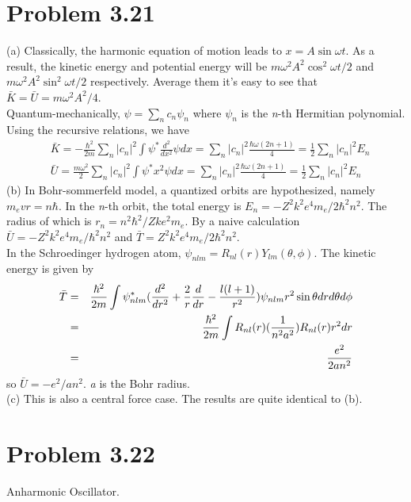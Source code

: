 \documentclass{article}
\begin{document}
\section*{Problem 3.21}
\noindent (a) Classically, the harmonic equation of motion leads to $x = A \sin \omega t$. As a result, the kinetic energy and potential energy will be $m \omega^{2} A^{2} \cos^{2} \omega t /2$ and $m \omega^{2} A^{2} \sin^{2} \omega t /2$ respectively. Average them it's easy to see that $\bar{K} = \bar{U} =m \omega^{2} A^{2}/4$.\\
Quantum-mechanically, $\psi = \sum_{n} c_{n} \psi_{n}$ where $\psi_{n}$ is the \emph{n}-th Hermitian polynomial. Using the recursive relations, we have
\begin{align}
&\bar{K} = -\frac{\hbar^{2}}{2m} \sum_{n} |c_{n}|^{2} \int \psi^{*} \frac{d^{2}}{dx^{2}} \psi dx = \sum_{n} |c_{n}|^{2} \frac{\hbar \omega (2n+1)}{4} = \frac{1}{2} \sum_{n} |c_{n}|^{2} E_{n}\\
&\bar{U} = \frac{m \omega^{2}}{2} \sum_{n} |c_{n}|^{2} \int \psi^{*} x^{2} \psi dx= \sum_{n} |c_{n}|^{2} \frac{\hbar \omega (2n+1)}{4} = \frac{1}{2} \sum_{n} |c_{n}|^{2} E_{n}
\end{align}
\noindent (b) In Bohr-sommerfeld model, a quantized orbits are hypothesized, namely $m_{e}vr = n \hbar$. In the \emph{n}-th orbit, the total energy is $E_{n} = - Z^{2}k^{2}e^{4}m_{e}/2 \hbar^{2} n^{2}$. The radius of which is $r_{n} = n^{2} \hbar^{2} / Zke^{2}m_{e}$. By a naive calculation $\bar{U} = - Z^{2}k^{2}e^{4}m_{e}/ \hbar^{2} n^{2}$ and $\bar{T} = Z^{2}k^{2}e^{4}m_{e}/2 \hbar^{2} n^{2}$.\\
In the Schroedinger hydrogen atom, $\psi_{nlm} = R_{nl}(r) Y_{lm}(\theta, \phi)$. The kinetic energy is given by
\begin{eqnarray}
\bar{T} &=& \frac{\hbar^{2}}{2m} \int \psi^{*}_{nlm} (\frac{d^{2}}{dr^{2}} + \frac{2}{r} \frac{d}{dr} - \frac{l(l+1)}{r^{2}})\psi_{nlm} r^{2} \sin \theta dr d\theta d\phi \notag \\
&=& \frac{\hbar^{2}}{2m} \int R_{nl}(r) (\frac{1}{n^{2}a^{2}}) R_{nl}(r) r^{2}dr \notag \\
&=& \frac{e^{2}}{2a n^{2}}
\end{eqnarray}
so $\bar{U} = - e^{2}/a n^{2}$. \emph{a} is the Bohr radius.\\
\noindent (c) This is also a central force case. The results are quite identical to (b).

\section*{Problem 3.22}
Anharmonic Oscillator.
\end{document}

